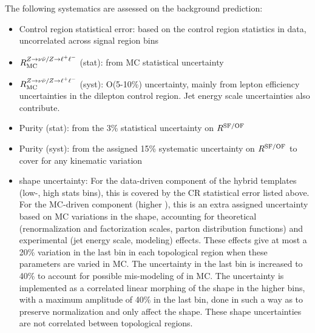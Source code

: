 The following systematics are assessed on the \znunu background prediction:
\begin{itemize}\setlength\itemsep{0mm}
\item Control region statistical error: based on the \zll control region statistics in data,
uncorrelated across signal region bins
\item $R_{\mathrm{MC}}^{Z\to\nu\bar{\nu}/Z\to\ell^+\ell^-}$ (stat): from MC statistical uncertainty
\item $R_{\mathrm{MC}}^{Z\to\nu\bar{\nu}/Z\to\ell^+\ell^-}$ (syst): O(5-10\%) uncertainty, mainly from lepton efficiency
uncertainties in the dilepton control region. Jet energy scale uncertainties also contribute.
\item Purity (stat): from the 3\% statistical uncertainty on $R^{\mathrm{SF/OF}}$
\item Purity (syst): from the assigned 15\% systematic uncertainty on $R^{\mathrm{SF/OF}}$ to cover
for any kinematic variation
\item \mttwo shape uncertainty: For the data-driven component of the hybrid templates (low-\mttwo,
  high stats bins), this is covered by the CR statistical error listed above. For the MC-driven
  component (higher \mttwo), this is an extra assigned uncertainty based on MC variations in 
  the \mttwo shape, accounting for theoretical (renormalization and factorization scales, parton
  distribution functions) and experimental (jet energy scale, \ptmiss modeling) effects. These
  effects give at most a 20\% variation in the last \mttwo bin in each topological region when
  these parameters are varied in MC. The uncertainty in the last bin is increased to 40\% to
  account for possible mis-modeling of \mttwo in MC. The uncertainty is implemented as a correlated
  linear morphing of the \mttwo shape in the higher \mttwo bins, with a maximum amplitude of 40\% in the last bin, 
  done in such a way as to preserve normalization and only affect the shape. These shape uncertainties
  are not correlated between topological regions.
\end{itemize}
